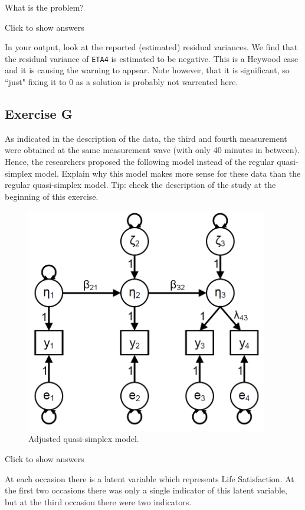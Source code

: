 \documentclass[
]{book}
\begin{document}
What is the problem?

Click to show answers

In your output, look at the reported (estimated) residual variances. We find that the residual variance of \texttt{ETA4} is estimated to be negative. This is a Heywood case and it is causing the warning to appear. Note however, that it is significant, so ``just" fixing it to 0 as a solution is probably not warrented here.

\hypertarget{exercise-g}{%
\subsection{Exercise G}\label{exercise-g}}

As indicated in the description of the data, the third and fourth measurement were obtained at the same measurement wave (with only 40 minutes in between). Hence, the researchers proposed the following model instead of the regular quasi-simplex model. Explain why this model makes more sense for these data than the regular quasi-simplex model. Tip: check the description of the study at the beginning of this exercise.

\begin{figure}
\centering
\includegraphics[width=4.16667in,height=\textheight]{Simplex-adjusted.png}
\caption{Adjusted quasi-simplex model.}
\end{figure}

Click to show answers

At each occasion there is a latent variable which represents Life Satisfaction. At the first two occasions there was only a single indicator of this latent variable, but at the third occasion there were two indicators.
\end{document}
